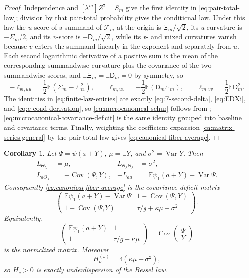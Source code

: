 \documentclass[11pt,a4paper]{amsart}
\numberwithin{equation}{section}
\theoremstyle{plain}
\newtheorem{corollary}[theorem]{Corollary}
\theoremstyle{definition}
\newcommand{\E}{\mathbb E}
\newcommand{\Dfin}{\mathsf D}
\newcommand{\Thetal}{\Theta_{\lambda}}
\begin{document}
\begin{proof}
Independence and \([\lambda^m]Z^2=S_m\) give the first identity in
\eqref{eq:pair-total-law}; division by that pair-total probability gives the
conditional law.  Under this law the \(u\)-score of a summand of
\(\mathcal F_m\) at the origin is \(\Xi_m/\sqrt2\), its \(u\)-curvature is
\(-\Sigma_m/2\), and its \(v\)-score is \(-\Dfin_m/\sqrt2\), while its \(v\)-
and mixed curvatures vanish because \(v\) enters the summand linearly in the
exponent and separately from \(u\).  Each second logarithmic derivative of a
positive sum is the mean of the corresponding summandwise curvature plus the
covariance of the two summandwise scores, and \(\E\Xi_m=\E\Dfin_m=0\) by
symmetry, so
\[
 -\ell_{m,uu}=\frac12\E(\Sigma_m-\Xi_m^2),\qquad
 \ell_{m,uv}=-\frac12\E(\Dfin_m\Xi_m),\qquad
 \ell_{m,vv}=\frac12\E\Dfin_m^2.
\]
The identities in \eqref{eq:finite-law-entries} are exactly
\eqref{eq:F-second-delta}, \eqref{eq:EDXi}, and
\eqref{eq:c-cond-derivation}, so \eqref{eq:microcanonical-schur} follows from
; \eqref{eq:microcanonical-covariance-deficit} is the
same identity grouped into baseline and covariance terms.  Finally, weighting
the coefficient expansion
\eqref{eq:matrix-series-general} by the pair-total law gives
\eqref{eq:canonical-fiber-average}.
\end{proof}

\begin{corollary}\label{cor:bessel-law}
Let \(\Psi=\psi(a+Y)\), \(\mu=\E Y\), and
\(\sigma^2=\operatorname{Var}Y\).  Then
\begin{align}
 L_{\Thetal}&=\mu,&
 L_{\Thetal\Thetal}&=\sigma^2,\label{eq:bessel-law-meanvar}\\
 L_{a\Thetal}&=-\operatorname{Cov}(\Psi,Y),&
 -L_{aa}&=\E\psi_1(a+Y)-\operatorname{Var}\Psi.\label{eq:bessel-law-param}
\end{align}
Consequently \eqref{eq:canonical-fiber-average} is the covariance-deficit
matrix
\begin{equation}\label{eq:covariance-deficit-matrix}
 \begin{pmatrix}
  \E\psi_1(a+Y)-\operatorname{Var}\Psi
  &1-\operatorname{Cov}(\Psi,Y)\\[1mm]
  1-\operatorname{Cov}(\Psi,Y)
  &\tau/g+\kappa\mu-\sigma^2
 \end{pmatrix}.
\end{equation}
Equivalently,
\begin{equation}\label{eq:covariance-loewner}
 \begin{pmatrix}
  \E\psi_1(a+Y)&1\\
  1&\tau/g+\kappa\mu
 \end{pmatrix}
 -\operatorname{Cov}\!\begin{pmatrix}\Psi\\Y\end{pmatrix}
\end{equation}
is the normalized matrix.  Moreover
\begin{equation}\label{eq:H-dispersion}
 H_\nu^{(\kappa)}=4(\kappa\mu-\sigma^2),
\end{equation}
so \(H_\nu>0\) is exactly underdispersion of the Bessel law.
\end{corollary}
\end{document}
